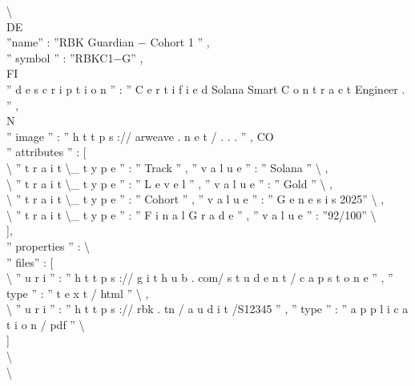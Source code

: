 \textbackslash{}{\\
\vspace{0.5em}
\vspace{0.5em}
\vspace{0.5em}
\vspace{0.5em}
DE\\
”name” : ”RBK Guardian − Cohort 1 ” ,\\
” symbol ” : ”RBKC1−G” ,\\
\vspace{0.5em}
\vspace{0.5em}
\vspace{0.5em}
\vspace{0.5em}
FI\\
” d e s c r i p t i o n ” : ” C e r t i f i e d Solana Smart C o n t r a c t Engineer . ” ,\\
\vspace{0.5em}
\vspace{0.5em}
\vspace{0.5em}
N\\
” image ” : ” h t t p s :// arweave . n e t / . . . ” ,           CO\\
” attributes ” : [\\
\textbackslash{}{ ” t r a i t \textbackslash{}_ t y p e ” : ” Track ” , ” v a l u e ” : ” Solana ” \textbackslash{}} ,\\
\textbackslash{}{ ” t r a i t \textbackslash{}_ t y p e ” : ” L e v e l ” , ” v a l u e ” : ” Gold ” \textbackslash{}} ,\\
\textbackslash{}{ ” t r a i t \textbackslash{}_ t y p e ” : ” Cohort ” , ” v a l u e ” : ” G e n e s i s 2025” \textbackslash{}} ,\\
\textbackslash{}{ ” t r a i t \textbackslash{}_ t y p e ” : ” F i n a l G r a d e ” , ” v a l u e ” : ”92/100” \textbackslash{}}\\
],\\
” properties ” : \textbackslash{}{\\
” files” : [\\
\textbackslash{}{ ” u r i ” : ” h t t p s :// g i t h u b . com/ s t u d e n t / c a p s t o n e ” , ” type ” : ” t e x t / html ” \textbackslash{}} ,\\
\textbackslash{}{ ” u r i ” : ” h t t p s :// rbk . tn / a u d i t /S12345 ” , ” type ” : ” a p p l i c a t i o n / pdf ” \textbackslash{}}\\
]\\
\textbackslash{}}\\
\textbackslash{}}\\
